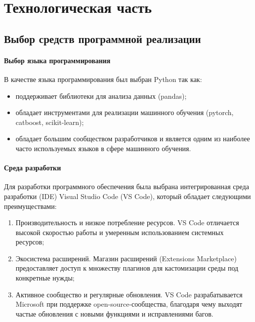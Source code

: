 \chapter{Технологическая часть}

\section{Выбор средств программной реализации}

\subsubsection{Выбор языка программирования}

В качестве языка программирования был выбран Python так как:
\begin{itemize}[label*=---]
	\item  поддерживает библиотеки для анализа данных (pandas);~\cite{pandas}
	\item  обладает инструментами для реализации машинного обучения (pytorch,
	catboost, scikit-learn);~\cite{pytorch, catboost, scl}
	\item обладает большим сообществом разработчиков и является одним из
	наиболее часто используемых языков в сфере машинного обучения.
\end{itemize}

\subsubsection{Среда разработки}

Для разработки программного обеспечения была выбрана интегрированная среда разработки (IDE) Visual Studio Code (VS Code), который обладает следующими преимуществами:
\begin{enumerate}
	\item Производительность и низкое потребление ресурсов.
	VS Code отличается высокой скоростью работы и умеренным использованием системных ресурсов;~\cite{vsc}
	\item Экосистема расширений.
	Магазин расширений (Extensions Marketplace) предоставляет доступ к множеству плагинов для кастомизации среды под конкретные нужды;~\cite{vsc}
	\item Активное сообщество и регулярные обновления.
	VS Code разрабатывается Microsoft при поддержке open-source-сообщества, благодаря чему выходят частые обновления с новыми функциями и исправлениями багов.~\cite{vsc}
\end{enumerate}


